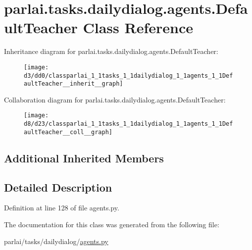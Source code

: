 \hypertarget{classparlai_1_1tasks_1_1dailydialog_1_1agents_1_1DefaultTeacher}{}\section{parlai.\+tasks.\+dailydialog.\+agents.\+Default\+Teacher Class Reference}
\label{classparlai_1_1tasks_1_1dailydialog_1_1agents_1_1DefaultTeacher}


Inheritance diagram for parlai.\+tasks.\+dailydialog.\+agents.\+Default\+Teacher\+:
\nopagebreak
\begin{figure}[H]
\begin{center}
\leavevmode
\texttt{[image: d3/dd0/classparlai\_1\_1tasks\_1\_1dailydialog\_1\_1agents\_1\_1DefaultTeacher\_\_inherit\_\_graph]}
\end{center}
\end{figure}


Collaboration diagram for parlai.\+tasks.\+dailydialog.\+agents.\+Default\+Teacher\+:
\nopagebreak
\begin{figure}[H]
\begin{center}
\leavevmode
\texttt{[image: d8/d23/classparlai\_1\_1tasks\_1\_1dailydialog\_1\_1agents\_1\_1DefaultTeacher\_\_coll\_\_graph]}
\end{center}
\end{figure}
\subsection*{Additional Inherited Members}


\subsection{Detailed Description}


Definition at line 128 of file agents.\+py.



The documentation for this class was generated from the following file\+:\begin{DoxyCompactItemize}
\item 
parlai/tasks/dailydialog/\hyperlink{parlai_2tasks_2dailydialog_2agents_8py}{agents.\+py}\end{DoxyCompactItemize}
